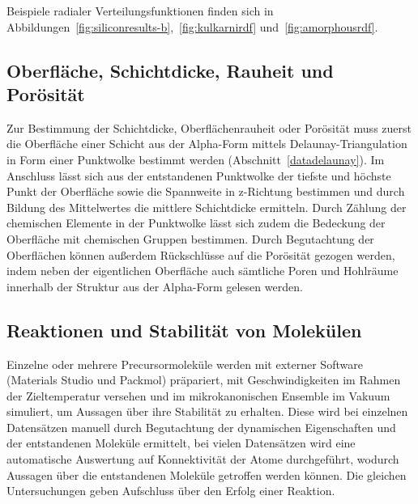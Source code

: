 Beispiele radialer Verteilungsfunktionen finden sich in Abbildungen~\ref{fig:siliconresults-b},~\ref{fig:kulkarnirdf} und~\ref{fig:amorphousrdf}.

\subsection{Oberfläche, Schichtdicke, Rauheit und Porösität}
\label{mdmethods-surface}

Zur Bestimmung der Schichtdicke, Oberflächenrauheit oder Porösität muss zuerst die Oberfläche einer Schicht aus der Alpha-Form mittels Delaunay-Triangulation in Form einer Punktwolke bestimmt werden (Abschnitt~\ref{datadelaunay}).
Im Anschluss lässt sich aus der entstandenen Punktwolke der tiefste und höchste Punkt der Oberfläche sowie die Spannweite in z-Richtung bestimmen und durch Bildung des Mittelwertes die mittlere Schichtdicke ermitteln.
Durch Zählung der chemischen Elemente in der Punktwolke lässt sich zudem die Bedeckung der Oberfläche mit chemischen Gruppen bestimmen.
Durch Begutachtung der Oberflächen können außerdem Rückschlüsse auf die Porösität gezogen werden, indem neben der eigentlichen Oberfläche auch sämtliche Poren und Hohlräume innerhalb der Struktur aus der Alpha-Form gelesen werden.

\subsection{Reaktionen und Stabilität von Molekülen}

Einzelne oder mehrere Precursormoleküle werden mit externer Software (Materials Studio\cite{biovia_materials_2014} und Packmol\cite{martinez_packmol:_2009}) präpariert, mit Geschwindigkeiten im Rahmen der Zieltemperatur versehen und im mikrokanonischen Ensemble im Vakuum simuliert, um Aussagen über ihre Stabilität zu erhalten.
Diese wird bei einzelnen Datensätzen manuell durch Begutachtung der dynamischen Eigenschaften und der entstandenen Moleküle ermittelt, bei vielen Datensätzen wird eine automatische Auswertung auf Konnektivität der Atome durchgeführt, wodurch Aussagen über die entstandenen Moleküle getroffen werden können.
Die gleichen Untersuchungen geben Aufschluss über den Erfolg einer Reaktion.
